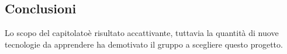 \subsection{Conclusioni}
Lo scopo del capitolato\glosp è risultato accattivante, tuttavia la quantità di nuove tecnologie da apprendere ha demotivato il gruppo a scegliere questo progetto\glo.